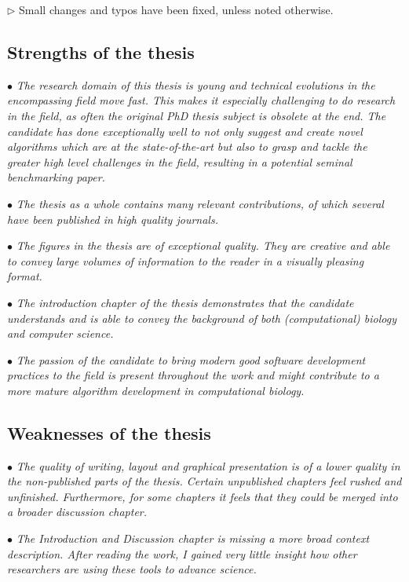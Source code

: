 \documentclass[10pt]{article}
\newcommand{\exam}[2][\  ]{\hspace{0pt}\marginpar{\color{red}#1}$\bullet$ \textit{#2}}
\newcommand{\imp}[1]{{\color{red} #1}}
\newcommand{\nimp}[1]{{\color{gray} #1}}
\newcommand{\answ}[1]{{\color{blue} $\triangleright$ #1}}
\newcommand{\bigexclaim}{\raisebox{-0.1em}{\BigTriangleUp}\hspace{-0.32em}\llap{\small\textbf{!}}\hspace{0.32em}}
\newcommand{\tagimp}{\bigexclaim}
\newcommand{\tagtime}{{\Large $\hourglass$}}
\begin{document}
{\answ{Small changes and typos have been fixed, unless noted otherwise.}

\subsection{Strengths of the thesis}

\exam{\nimp{The research domain of this thesis is young and technical evolutions in the
	encompassing field move fast. This makes it especially challenging to do
	research in the field, as often the original PhD thesis subject is obsolete at the
	end. The candidate has done exceptionally well to not only suggest and create
	novel algorithms which are at the state-of-the-art but also to grasp and tackle
	the greater high level challenges in the field, resulting in a potential seminal
	benchmarking paper.}}

\exam{\nimp{The thesis as a whole contains many relevant contributions, of which several
	have been published in high quality journals.}}

\exam{\nimp{The figures in the thesis are of exceptional quality. They are creative and able
	to convey large volumes of information to the reader in a visually pleasing
	format.}}

\exam{\nimp{The introduction chapter of the thesis demonstrates that the candidate
	understands and is able to convey the background of both (computational)
	biology and computer science.}}

\exam{\nimp{The passion of the candidate to bring modern good software development
	practices to the field is present throughout the work and might contribute to a
	more mature algorithm development in computational biology.}}



\subsection{Weaknesses of the thesis}
\exam[\tagimp \tagtime]{\imp{The quality of writing, layout and graphical presentation is of a lower quality in the non-published parts of the thesis. Certain unpublished chapters feel rushed and unfinished. Furthermore, for some chapters it feels that they could be merged into a broader discussion chapter.}}

\exam[\tagimp \tagtime]{\imp{The Introduction and Discussion chapter is missing a more broad context
	description. After reading the work, I gained very little insight how other
	researchers are using these tools to advance science.}}


}
\end{document}
